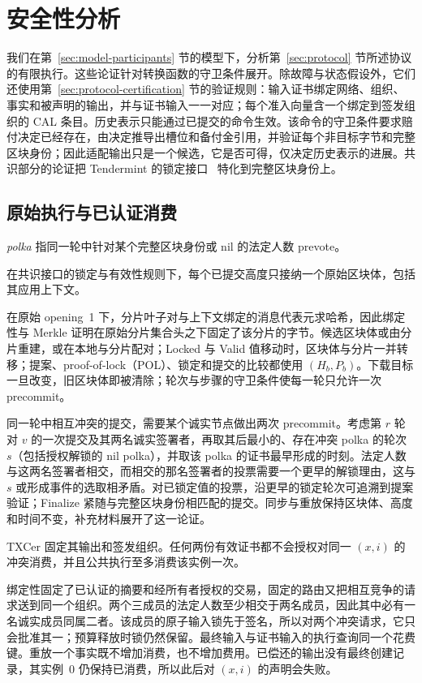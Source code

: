 \section{安全性分析}
\label{sec:security}

我们在第~\ref{sec:model-participants} 节的模型下，分析第~\ref{sec:protocol} 节所述协议的有限执行。这些论证针对转换函数的守卫条件展开。除故障与状态假设外，它们还使用第~\ref{sec:protocol-certification} 节的验证规则：输入证书绑定网络、组织、事实和被声明的输出，并与证书输入一一对应；每个准入向量含一个绑定到签发组织的 CAL 条目。历史表示只能通过已提交的命令生效。该命令的守卫条件要求赔付决定已经存在，由决定推导出槽位和备付金引用，并验证每个非目标字节和完整区块身份；因此适配输出只是一个候选，它是否可得，仅决定历史表示的进展。共识部分的论证把 Tendermint 的锁定接口~\cite{tendermint} 特化到完整区块身份上。

\subsection{原始执行与已认证消费}
\label{sec:security-identity}

\emph{polka} 指同一轮中针对某个完整区块身份或 nil 的法定人数 prevote。

\begin{lemma}[原始执行一致性]
\label{lem:security-original}
在共识接口的锁定与有效性规则下，每个已提交高度只接纳一个原始区块体，包括其应用上下文。
\end{lemma}
\begin{IEEEproof}
在原始 opening~1 下，分片叶子对与上下文绑定的消息代表元求哈希，因此绑定性与 Merkle 证明在原始分片集合头之下固定了该分片的字节。候选区块体或由分片重建，或在本地与分片配对；Locked 与 Valid 值移动时，区块体与分片一并转移；提案、proof-of-lock（POL）、锁定和提交的比较都使用 $(H_b,P_b)$。下载目标一旦改变，旧区块体即被清除；轮次与步骤的守卫条件使每一轮只允许一次 precommit。

同一轮中相互冲突的提交，需要某个诚实节点做出两次 precommit。考虑第 $r$ 轮对 $v$ 的一次提交及其两名诚实签署者，再取其后最小的、存在冲突 polka 的轮次 $s$（包括授权解锁的 nil polka），并取该 polka 的证书最早形成的时刻。法定人数与这两名签署者相交，而相交的那名签署者的投票需要一个更早的解锁理由，这与 $s$ 或形成事件的选取相矛盾。对已锁定值的投票，沿更早的锁定轮次可追溯到提案验证；Finalize 紧随与完整区块身份相匹配的提交。同步与重放保持区块体、高度和时间不变，补充材料展开了这一论证。
\end{IEEEproof}

\begin{lemma}[经认证的唯一消费]
\label{lem:security-consumption}
TXCer 固定其输出和签发组织。任何两份有效证书都不会授权对同一 $(x,i)$ 的冲突消费，并且公共执行至多消费该实例一次。
\end{lemma}
\begin{IEEEproof}
绑定性固定了已认证的摘要和经所有者授权的交易，固定的路由又把相互竞争的请求送到同一个组织。两个三成员的法定人数至少相交于两名成员，因此其中必有一名诚实成员同属二者。该成员的原子输入锁先于签名，所以对两个冲突请求，它只会批准其一；预算释放时锁仍然保留。最终输入与证书输入的执行查询同一个花费键。重放一个事实既不增加消费，也不增加费用。已偿还的输出没有最终创建记录，其实例~0 仍保持已消费，所以此后对 $(x,i)$ 的声明会失败。
\end{IEEEproof}

